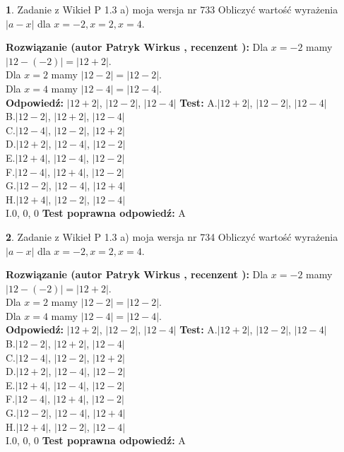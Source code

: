 \documentclass[12pt, a4paper]{article}
\theoremstyle{definition} %
\newtheorem{zad}{}
\newcommand{\zadStart}[1]{\begin{zad}#1\newline}
\newcommand{\zadStop}{\end{zad}}
\newcommand{\rozwStart}[2]{\noindent \textbf{Rozwiązanie (autor #1 , recenzent #2): }\newline}
\newcommand{\rozwStop}{\newline}
\newcommand{\odpStart}{\noindent \textbf{Odpowiedź:}\newline}
\newcommand{\odpStop}{\newline}
\newcommand{\testStart}{\noindent \textbf{Test:}\newline}
\newcommand{\testStop}{\newline}
\newcommand{\kluczStart}{\noindent \textbf{Test poprawna odpowiedź:}\newline}
\newcommand{\kluczStop}{\newline}
\begin{document}
\zadStart{Zadanie z Wikieł P 1.3 a) moja wersja nr 733}
Obliczyć wartość wyrażenia $|a - x|$ dla $x=-2,x=2,x=4$.
\zadStop
\rozwStart{Patryk Wirkus}{}
Dla $x = -2$ mamy $|12 - (-2)| = |12 + 2|$.\\
Dla $x = 2$ mamy $|12 - 2| = |12 - 2|$.\\
Dla $x = 4$ mamy $|12 - 4| = |12 - 4|$.\\
\rozwStop
\odpStart
$|12 + 2|$, $|12 - 2|$, $|12 - 4|$
\odpStop
\testStart
A.$|12 + 2|$, $|12 - 2|$, $|12 - 4|$\\
B.$|12 - 2|$, $|12 + 2|$, $|12 - 4|$\\
C.$|12 - 4|$, $|12 - 2|$, $|12 + 2|$\\
D.$|12 + 2|$, $|12 - 4|$, $|12 - 2|$\\
E.$|12 + 4|$, $|12 - 4|$, $|12 - 2|$\\
F.$|12 - 4|$, $|12 + 4|$, $|12 - 2|$\\
G.$|12 - 2|$, $|12 - 4|$, $|12 + 4|$\\
H.$|12 + 4|$, $|12 - 2|$, $|12 - 4|$\\
I.$0$, $0$, $0$
\testStop
\kluczStart
A
\kluczStop



\zadStart{Zadanie z Wikieł P 1.3 a) moja wersja nr 734}
Obliczyć wartość wyrażenia $|a - x|$ dla $x=-2,x=2,x=4$.
\zadStop
\rozwStart{Patryk Wirkus}{}
Dla $x = -2$ mamy $|12 - (-2)| = |12 + 2|$.\\
Dla $x = 2$ mamy $|12 - 2| = |12 - 2|$.\\
Dla $x = 4$ mamy $|12 - 4| = |12 - 4|$.\\
\rozwStop
\odpStart
$|12 + 2|$, $|12 - 2|$, $|12 - 4|$
\odpStop
\testStart
A.$|12 + 2|$, $|12 - 2|$, $|12 - 4|$\\
B.$|12 - 2|$, $|12 + 2|$, $|12 - 4|$\\
C.$|12 - 4|$, $|12 - 2|$, $|12 + 2|$\\
D.$|12 + 2|$, $|12 - 4|$, $|12 - 2|$\\
E.$|12 + 4|$, $|12 - 4|$, $|12 - 2|$\\
F.$|12 - 4|$, $|12 + 4|$, $|12 - 2|$\\
G.$|12 - 2|$, $|12 - 4|$, $|12 + 4|$\\
H.$|12 + 4|$, $|12 - 2|$, $|12 - 4|$\\
I.$0$, $0$, $0$
\testStop
\kluczStart
A
\kluczStop
\end{document}
